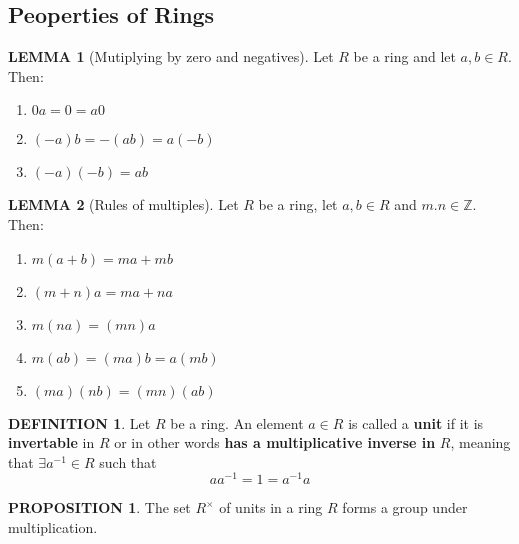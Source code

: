 \documentclass[12pt]{article}
\theoremstyle{definition}
\newtheorem{definition}{DEFINITION}[subsection]
\newtheorem{lemma}{LEMMA}[subsection]
\newtheorem{prop}{PROPOSITION}[subsection]
\begin{document}
\subsection{Peoperties of Rings}
\begin{lemma}[Mutiplying by zero and negatives]
    Let $R$ be a ring and let $a,b \in R$. Then:
    \begin{enumerate}
        \item $0a = 0 = a0$
        \item $(-a)b = -(ab) = a(-b)$
        \item $(-a)(-b) = ab$
    \end{enumerate}
\end{lemma}

\begin{lemma}[Rules of multiples]
    Let $R$ be a ring, let $a,b\in R$ and $m.n \in \mathbb{Z}$. Then:
    \begin{enumerate}
        \item $m(a+b) = ma + mb$
        \item $(m+n)a = ma + na$
        \item $m(na) = (mn)a$
        \item $m(ab) = (ma)b = a(mb)$
        \item $(ma)(nb) = (mn)(ab)$
    \end{enumerate}
\end{lemma}

\begin{definition}
    Let $R$ be a ring. An element $a \in R$ is called a \textbf{unit} if it is \textbf{invertable} in $R$ or in other words \textbf{has a multiplicative inverse in} $R$, meaning that $\exists a^{-1} \in R$ such that $$aa^{-1} = 1 = a^{-1}a$$
\end{definition}

\begin{prop}
    The set $R^{\times}$ of units in a ring $R$ forms a group under multiplication.
\end{prop}

\end{document}
